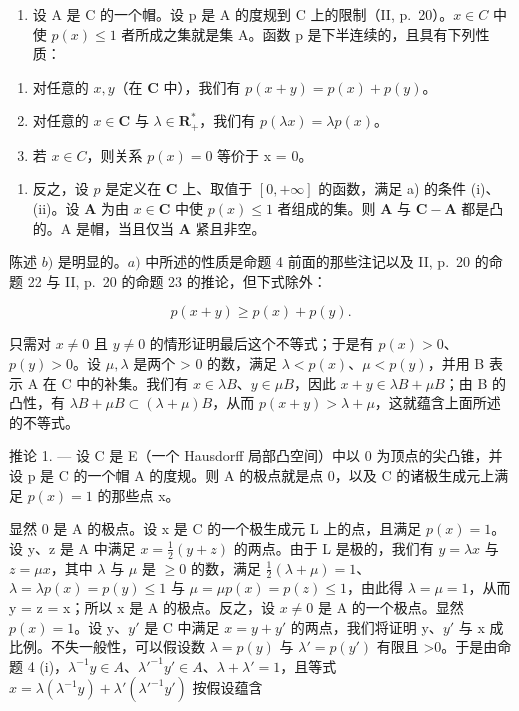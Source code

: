 \begin{enumerate}
\def\labelenumi{\alph{enumi})}
\tightlist
\item
  设 A 是 C 的一个帽。设 p 是 A 的度规到 C 上的限制（II, p.~20）。\(x \in C\) 中使 \(p(x) \leqslant 1\) 者所成之集就是集 A。函数 p 是下半连续的，且具有下列性质：
\end{enumerate}

\begin{enumerate}
\def\labelenumi{(\roman{enumi})}
\item
  对任意的 \(x, y\)（在 \(\mathbf{C}\) 中），我们有 \(p(x + y) = p(x) + p(y)\)。
\item
  对任意的 \(x \in \mathbf{C}\) 与 \(\lambda \in \mathbf{R}_{+}^{*}\)，我们有 \(p(\lambda x) = \lambda p(x)\)。
\item
  若 \(x \in C\)，则关系 \(p(x) = 0\) 等价于 x = 0。
\end{enumerate}

\begin{enumerate}
\def\labelenumi{\alph{enumi})}
\setcounter{enumi}{1}
\tightlist
\item
  反之，设 \(p\) 是定义在 \(\mathbf{C}\) 上、取值于 \([0, +\infty]\) 的函数，满足 a) 的条件 (i)、(ii)。设 \(\mathbf{A}\) 为由 \(x \in \mathbf{C}\) 中使 \(p(x) \leqslant 1\) 者组成的集。则 \(\mathbf{A}\) 与 \(\mathbf{C} - \mathbf{A}\) 都是凸的。A 是帽，当且仅当 \(\mathbf{A}\) 紧且非空。
\end{enumerate}

陈述 \(b)\) 是明显的。\(a)\) 中所述的性质是命题 4 前面的那些注记以及 II, p.~20 的命题 22 与 II, p.~20 的命题 23 的推论，但下式除外：

\[
p (x + y) \geqslant p (x) + p (y).
\]

只需对 \(x \neq 0\) 且 \(y \neq 0\) 的情形证明最后这个不等式；于是有 \(p(x) > 0\)、\(p(y) > 0\)。设 \(\mu, \lambda\) 是两个 \textgreater{} 0 的数，满足 \(\lambda < p(x)\)、\(\mu < p(y)\)，并用 B 表示 A 在 C 中的补集。我们有 \(x \in \lambda B\)、\(y \in \mu B\)，因此 \(x + y \in \lambda B + \mu B\)；由 B 的凸性，有 \(\lambda B + \mu B \subset (\lambda + \mu)B\)，从而 \(p(x + y) > \lambda + \mu\)，这就蕴含上面所述的不等式。

推论 1. --- 设 C 是 E（一个 Hausdorff 局部凸空间）中以 0 为顶点的尖凸锥，并设 p 是 C 的一个帽 A 的度规。则 A 的极点就是点 0，以及 C 的诸极生成元上满足 \(p(x) = 1\) 的那些点 x。

显然 0 是 A 的极点。设 x 是 C 的一个极生成元 L 上的点，且满足 \(p(x) = 1\)。设 y、z 是 A 中满足 \(x = \frac{1}{2}(y + z)\) 的两点。由于 L 是极的，我们有 \(y = \lambda x\) 与 \(z = \mu x\)，其中 \(\lambda\) 与 \(\mu\) 是 \(\geqslant 0\) 的数，满足 \(\frac{1}{2}(\lambda + \mu) = 1\)、\(\lambda = \lambda p(x) = p(y) \leqslant 1\) 与 \(\mu = \mu p(x) = p(z) \leqslant 1\)，由此得 \(\lambda = \mu = 1\)，从而 y = z = x；所以 x 是 A 的极点。反之，设 \(x \neq 0\) 是 A 的一个极点。显然 \(p(x) = 1\)。设 y、\(y'\) 是 C 中满足 \(x = y + y'\) 的两点，我们将证明 y、\(y'\) 与 x 成比例。不失一般性，可以假设数 \(\lambda = p(y)\) 与 \(\lambda' = p(y')\) 有限且 \textgreater0。于是由命题 4 (i)，\(\lambda^{-1}y \in A\)、\(\lambda'^{-1}y' \in A\)、\(\lambda + \lambda' = 1\)，且等式 \(x = \lambda(\lambda^{-1}y) + \lambda'(\lambda'^{-1}y')\) 按假设蕴含


